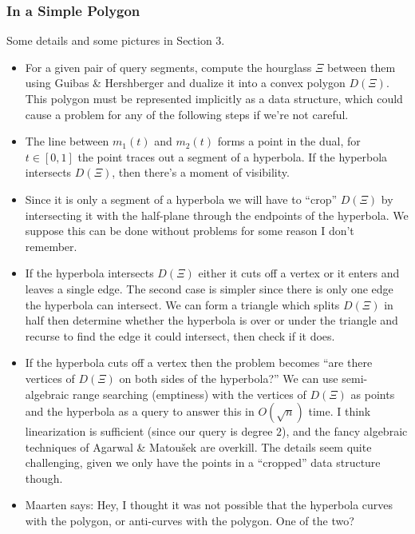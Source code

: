 \documentclass{article}
\begin{document}
\subsubsection{In a Simple Polygon}
Some details and some pictures in Section 3.
\begin{itemize}
    \item For a given pair of query segments, compute the hourglass $\Xi$ between them using Guibas \& Hershberger and dualize it into a convex polygon $D(\Xi)$. This polygon must be represented implicitly as a data structure, which could cause a problem for any of the following steps if we're not careful.
    \item The line between $m_1(t)$ and $m_2(t)$ forms a point in the dual, for $t \in [0,1]$ the point traces out a segment of a hyperbola. If the hyperbola intersects $D(\Xi)$, then there's a moment of visibility.
    \item Since it is only a segment of a hyperbola we will have to ``crop'' $D(\Xi)$ by intersecting it with the half-plane through the endpoints of the hyperbola. We suppose this can be done without problems for some reason I don't remember.
    \item If the hyperbola intersects $D(\Xi)$ either it cuts off a vertex or it enters and leaves a single edge. The second case is simpler since there is only one edge the hyperbola can intersect. We can form a triangle which splits $D(\Xi)$ in half then determine whether the hyperbola is over or under the triangle and recurse to find the edge it could intersect, then check if it does.
    \item If the hyperbola cuts off a vertex then the problem becomes ``are there vertices of $D(\Xi)$ on both sides of the hyperbola?'' We can use semi-algebraic range searching (emptiness) with the vertices of $D(\Xi)$ as points and the hyperbola as a query to answer this in $O(\sqrt n)$ time. I think linearization is sufficient (since our query is degree $2$), and the fancy algebraic techniques of Agarwal \& Matoušek  are overkill. The details seem quite challenging, given we only have the points in a ``cropped'' data structure though.
    \item Maarten says: Hey, I thought it was not possible that the hyperbola curves with the polygon, or anti-curves with the polygon. One of the two?
\end{itemize}
\end{document}
